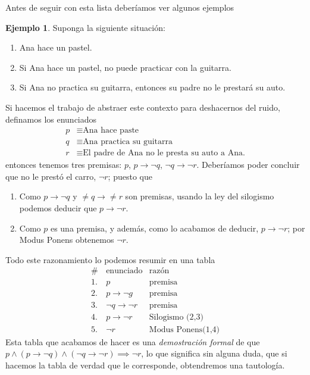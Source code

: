 \documentclass{book}
\theoremstyle{definition}
\newtheorem{ejm}{Ejemplo}[chapter]
\begin{document}
Antes de seguir con esta lista deberíamos ver algunos ejemplos
\begin{ejm}
	Suponga la siguiente situación:
	\begin{enumerate}
		\item Ana hace un pastel.
		\item Si Ana hace un pastel, no puede practicar con la guitarra.
		\item Si Ana no practica su guitarra, entonces su padre no le prestará su auto.
	\end{enumerate}
	Si hacemos el trabajo de abstraer este contexto para deshacernos del ruido, definamos los enunciados
	\begin{align*}
		p &\equiv \text{Ana hace paste}\\
		q &\equiv \text{Ana practica su guitarra}\\
		r &\equiv \text{El padre de Ana no le presta su auto a Ana.}
	\end{align*}
	entonces tenemos tres premisas: $p$, $p \rightarrow \neg q$, $\neg q \rightarrow \neg r$. Deberíamos poder concluir que no le prestó el carro, $\neg r$; puesto que
	\begin{enumerate}
		\item Como $p \rightarrow \neg q$ y $\neq q \rightarrow \neq r$ son premisas, usando la ley del silogismo podemos deducir que $p \rightarrow \neg r$.
		\item Como $p$ es una premisa, y además, como lo acabamos de deducir, $p \rightarrow \neg r$; por Modus Ponens obtenemos $\neg r$.
	\end{enumerate}
	Todo este razonamiento lo podemos resumir en una tabla	
	\begin{align*}
		\# \, & \text{enunciado} & \text{razón}\\
		1.& p & \text{premisa} \\
		2.& p \rightarrow \neg g & \text{premisa}\\
		3.& \neg q \rightarrow \neg r & \text{premisa}\\
		4.& p \rightarrow \neg r & \text{Silogismo (2,3)}\\
		5.& \neg r & \text{Modus Ponens(1,4)}
	\end{align*}
	Esta tabla que acabamos de hacer es una \emph{demostración formal} de que
	$p \wedge (p \rightarrow \neg q) \wedge (\neg q \rightarrow \neg r) \implies \neg r$, lo que significa sin alguna duda, que si hacemos la tabla de verdad que le corresponde, obtendremos una tautología.
	

\end{ejm}
\end{document}
